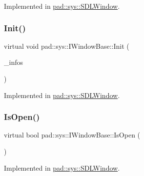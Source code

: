 Implemented in \mbox{\hyperlink{classpad_1_1sys_1_1_s_d_l_window_a4b39d8767776e1fe6f613ad3fe7d7b29}{pad\+::sys\+::\+S\+D\+L\+Window}}.

\mbox{\label{classpad_1_1sys_1_1_i_window_base_aee66a6eacff6126f4106a8e725bcbf1f}} 
\subsubsection{\texorpdfstring{Init()}{Init()}}
{\footnotesize\ttfamily virtual void pad\+::sys\+::\+I\+Window\+Base\+::\+Init (\begin{DoxyParamCaption}\item[{const \mbox{\hyperlink{structpad_1_1sys_1_1_window_settings}{Window\+Settings}} \&}]{\+\_\+infos }\end{DoxyParamCaption})\hspace{0.3cm}{\ttfamily [pure virtual]}}



Implemented in \mbox{\hyperlink{classpad_1_1sys_1_1_s_d_l_window_a7749e49f614ac33a95f1ef4ffed853e7}{pad\+::sys\+::\+S\+D\+L\+Window}}.

\mbox{\label{classpad_1_1sys_1_1_i_window_base_a07aae1254b0d8139e912584029d785ea}} 
\subsubsection{\texorpdfstring{Is\+Open()}{IsOpen()}}
{\footnotesize\ttfamily virtual bool pad\+::sys\+::\+I\+Window\+Base\+::\+Is\+Open (\begin{DoxyParamCaption}{ }\end{DoxyParamCaption})\hspace{0.3cm}{\ttfamily [pure virtual]}}



Implemented in \mbox{\hyperlink{classpad_1_1sys_1_1_s_d_l_window_ae76d9066f3c36e8b949b6c211be0affd}{pad\+::sys\+::\+S\+D\+L\+Window}}.

\mbox{\label{classpad_1_1sys_1_1_i_window_base_aee21db35ea6bdd4299783b4e96a9b326}} 
